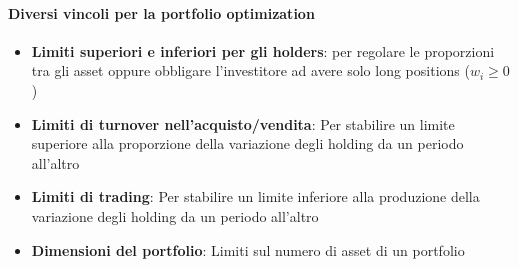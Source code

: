 \documentclass[12pt]{article}
\begin{document}
\paragraph{Diversi vincoli per la portfolio optimization}
\begin{itemize}
    \item \textbf{Limiti superiori e inferiori per gli holders}: per regolare le proporzioni tra gli asset oppure obbligare l'investitore ad avere solo long positions ($w_i \geq 0$)
    \item \textbf{Limiti di turnover nell'acquisto/vendita}: Per stabilire un limite superiore alla proporzione della variazione degli holding da un periodo all'altro
    \item \textbf{Limiti di trading}: Per stabilire un limite inferiore alla produzione della variazione degli holding da un periodo all'altro
    \item \textbf{Dimensioni del portfolio}: Limiti sul numero di asset di un portfolio
\end{itemize}
\end{document}
